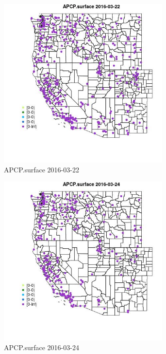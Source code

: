 \begin{figure} 
\centering  
\includegraphics[width=0.77\textwidth]{Code_Outputs/Report_ML_input_PM25_Step4_part_e_de_duplicated_aveswNAs_MapObsAPCPsurface2016-03-22.jpg} 
\caption{\label{fig:Report_ML_input_PM25_Step4_part_e_de_duplicated_aveswNAsMapObsAPCPsurface2016-03-22}APCP.surface 2016-03-22} 
\end{figure} 
 

\begin{figure} 
\centering  
\includegraphics[width=0.77\textwidth]{Code_Outputs/Report_ML_input_PM25_Step4_part_e_de_duplicated_aveswNAs_MapObsAPCPsurface2016-03-24.jpg} 
\caption{\label{fig:Report_ML_input_PM25_Step4_part_e_de_duplicated_aveswNAsMapObsAPCPsurface2016-03-24}APCP.surface 2016-03-24} 
\end{figure} 
 

